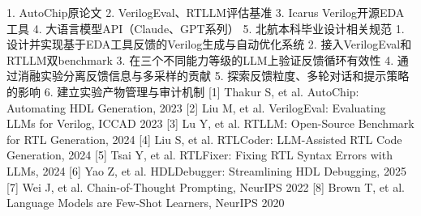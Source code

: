 \assignReq
{1. AutoChip原论文}
{2. VerilogEval、RTLLM评估基准}
{3. Icarus Verilog开源EDA工具}
{4. 大语言模型API（Claude、GPT系列）}
{5. 北航本科毕业设计相关规范}
\assignWork
{1. 设计并实现基于EDA工具反馈的Verilog生成与自动优化系统}
{2. 接入VerilogEval和RTLLM双benchmark}
{3. 在三个不同能力等级的LLM上验证反馈循环有效性}
{4. 通过消融实验分离反馈信息与多采样的贡献}
{5. 探索反馈粒度、多轮对话和提示策略的影响}
{6. 建立实验产物管理与审计机制}
\assignRef
{[1] Thakur S, et al. AutoChip: Automating HDL Generation, 2023}
{[2] Liu M, et al. VerilogEval: Evaluating LLMs for Verilog, ICCAD 2023}
{[3] Lu Y, et al. RTLLM: Open-Source Benchmark for RTL Generation, 2024}
{[4] Liu S, et al. RTLCoder: LLM-Assisted RTL Code Generation, 2024}
{[5] Tsai Y, et al. RTLFixer: Fixing RTL Syntax Errors with LLMs, 2024}
{[6] Yao Z, et al. HDLDebugger: Streamlining HDL Debugging, 2025}
{[7] Wei J, et al. Chain-of-Thought Prompting, NeurIPS 2022}
{[8] Brown T, et al. Language Models are Few-Shot Learners, NeurIPS 2020}
